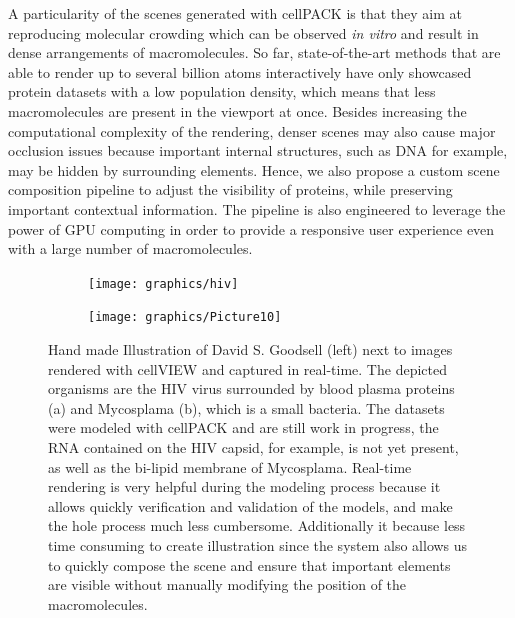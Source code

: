 A particularity of the scenes generated with cellPACK is that they aim at reproducing molecular crowding which can be observed \textit{in vitro} and result in dense arrangements of macromolecules.
So far, state-of-the-art methods that are able to render up to several billion atoms interactively have only showcased protein datasets with a low population density, which means that less macromolecules are present in the viewport at once.
Besides increasing the computational complexity of the rendering, denser scenes may also cause major occlusion issues because important internal structures, such as DNA for example, may be hidden by surrounding elements.
Hence, we also propose a custom scene composition pipeline to adjust the visibility of proteins, while preserving important contextual information.
The pipeline is also engineered to leverage the power of GPU computing in order to provide a responsive user experience even with a large number of macromolecules.


\begin{figure}
	\centering
	\begin{subfigure}[b]{0.99\textwidth}
		\texttt{[image: graphics/hiv]}
	\end{subfigure}
	
	\begin{subfigure}[b]{0.99\textwidth}
		\texttt{[image: graphics/Picture10]}
	\end{subfigure}
	\caption{Hand made Illustration of David S. Goodsell (left) next to images rendered with cellVIEW and captured in real-time. The depicted organisms are the HIV virus surrounded by blood plasma proteins (a) and Mycosplama (b), which is a small bacteria. The datasets were modeled with cellPACK and are still work in progress, the RNA contained on the HIV capsid, for example, is not yet present, as well as the bi-lipid membrane of Mycosplama. Real-time rendering is very helpful during the modeling process because it allows quickly verification and validation of the models, and make the hole process much less cumbersome. Additionally it because less time consuming to create illustration since the system also allows us to quickly compose the scene and ensure that important elements are visible without manually modifying the position of the macromolecules.}
	\label{fig:cellVIEWvsGoodsell}
\end{figure}

%

